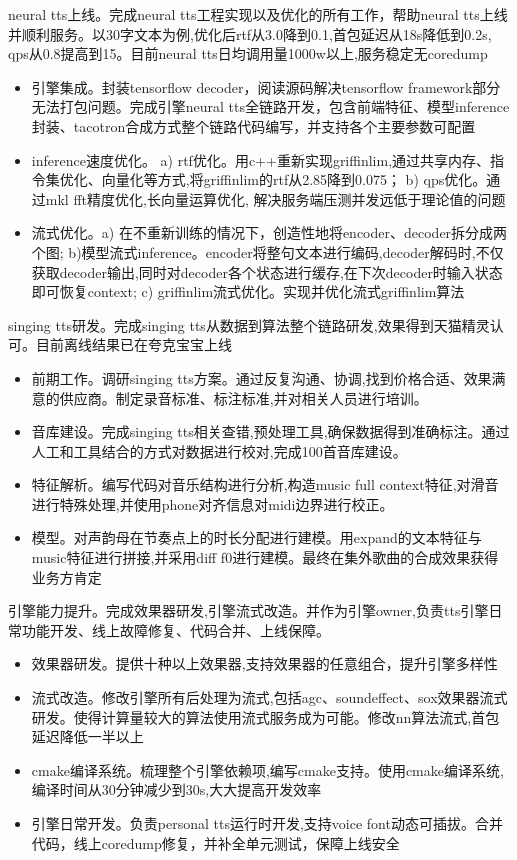 \documentclass{resume}
\begin{document}
neural tts上线。完成neural tts工程实现以及优化的所有工作，帮助neural tts上线并顺利服务。以30字文本为例,优化后rtf从3.0降到0.1,首包延迟从18s降低到0.2s, qps从0.8提高到15。目前neural tts日均调用量1000w以上,服务稳定无coredump
\begin{itemize}
  \item 引擎集成。封装tensorflow decoder，阅读源码解决tensorflow framework部分无法打包问题。完成引擎neural tts全链路开发，包含前端特征、模型inference封装、tacotron合成方式整个链路代码编写，并支持各个主要参数可配置
  \item inference速度优化。 a) rtf优化。用c++重新实现griffinlim,通过共享内存、指令集优化、向量化等方式,将griffinlim的rtf从2.85降到0.075； b) qps优化。通过mkl fft精度优化,长向量运算优化, 解决服务端压测并发远低于理论值的问题
  \item 流式优化。a) 在不重新训练的情况下，创造性地将encoder、decoder拆分成两个图; b)模型流式inference。encoder将整句文本进行编码,decoder解码时,不仅获取decoder输出,同时对decoder各个状态进行缓存,在下次decoder时输入状态即可恢复context; c) griffinlim流式优化。实现并优化流式griffinlim算法
\end{itemize}

singing tts研发。完成singing tts从数据到算法整个链路研发,效果得到天猫精灵认可。目前离线结果已在夸克宝宝上线
\begin{itemize}
  \item 前期工作。调研singing tts方案。通过反复沟通、协调,找到价格合适、效果满意的供应商。制定录音标准、标注标准,并对相关人员进行培训。
  \item 音库建设。完成singing tts相关查错,预处理工具,确保数据得到准确标注。通过人工和工具结合的方式对数据进行校对,完成100首音库建设。
  \item 特征解析。编写代码对音乐结构进行分析,构造music full context特征,对滑音进行特殊处理,并使用phone对齐信息对midi边界进行校正。
  \item 模型。对声韵母在节奏点上的时长分配进行建模。用expand的文本特征与music特征进行拼接,并采用diff f0进行建模。最终在集外歌曲的合成效果获得业务方肯定
\end{itemize}

引擎能力提升。完成效果器研发,引擎流式改造。并作为引擎owner,负责tts引擎日常功能开发、线上故障修复、代码合并、上线保障。
\begin{itemize}
  \item 效果器研发。提供十种以上效果器,支持效果器的任意组合，提升引擎多样性
  \item 流式改造。修改引擎所有后处理为流式,包括agc、soundeffect、sox效果器流式研发。使得计算量较大的算法使用流式服务成为可能。修改nn算法流式,首包延迟降低一半以上
  \item cmake编译系统。梳理整个引擎依赖项,编写cmake支持。使用cmake编译系统,编译时间从30分钟减少到30s,大大提高开发效率
  \item 引擎日常开发。负责personal tts运行时开发,支持voice font动态可插拔。合并代码，线上coredump修复，并补全单元测试，保障上线安全
\end{itemize}
\end{document}
